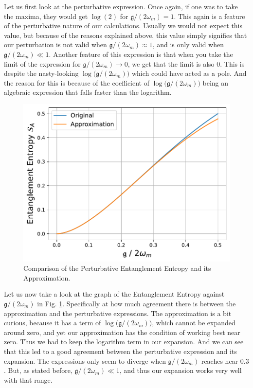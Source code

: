 \documentclass[12pt,a4paper]{report}
\theoremstyle{plain}
\theoremstyle{definition}
\theoremstyle{remark}
\begin{document}
Let us first look at the perturbative expression. Once again, if one was to take the maxima, they would get $\log(2)$ for $\mathfrak{g}/(2\omega_{m}) = 1$. This again is a feature of the perturbative nature of our calculations. Usually we would not expect this value, but because of the reasons explained above, this value simply signifies that our perturbation is not valid when $\mathfrak{g}/(2\omega_{m}) \approx 1$, and is only valid when $\mathfrak{g}/(2\omega_{m}) \ll 1$. Another feature of this expression is that when you take the limit of the expression for $\mathfrak{g}/(2\omega_{m}) \rightarrow 0$, we get that the limit is also $0$. This is despite the nasty-looking $\log\big(\mathfrak{g}/(2\omega_{m})\big)$ which could have acted as a pole. And the reason for this is because of the coefficient of $\log\big(\mathfrak{g}/(2\omega_{m})\big)$ being an algebraic expression that falls faster than the logarithm.

\begin{figure}[h]
    \centering
    \includegraphics[width=12cm]{EEApprox.pdf}
    \caption{Comparison of the Perturbative Entanglement Entropy and its Approximation.}
    \label{fig: EE1}
\end{figure}

Let us now take a look at the graph of the Entanglement Entropy against $\mathfrak{g}/(2\omega_{m})$ in Fig. \ref{fig: EE1}. Specifically at how much agreement there is between the approximation and the perturbative expressions. The approximation is a bit curious, because it has a term of $\log\big(\mathfrak{g}/(2\omega_{m})\big)$, which cannot be expanded around zero, and yet our approximation has the condition of working best near zero. Thus we had to keep the logarithm term in our expansion. And we can see that this led to a good agreement between the perturbative expression and its expansion. The expressions only seem to diverge when $\mathfrak{g}/(2\omega_{m})$ reaches near $0.3$. But, as stated before, $\mathfrak{g}/(2\omega_{m}) \ll 1$, and thus our expansion works very well with that range.
\end{document}
